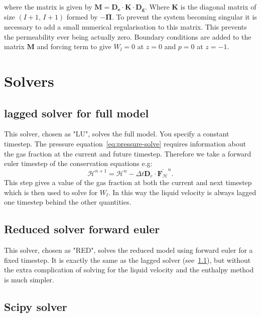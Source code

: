 \documentclass[a4paper,11pt]{article}
\numberwithin{equation}{section}
\begin{document}
where the matrix is given by $\boldsymbol{M} = \boldsymbol{D_e} \cdot \boldsymbol{K} \cdot \boldsymbol{D_g}$.
Where $\boldsymbol{K}$ is the diagonal matrix of size $(I+1, \, I+1)$ formed by $-\overline{\boldsymbol{\Pi}}$.
To prevent the system becoming singular it is necessary to add a small numerical regularisation to this matrix.
This prevents the permeability ever being actually zero.
Boundary conditions are added to the matrix $\boldsymbol{M}$ and forcing term to give
$W_l = 0$ at  $z=0$
and $p=0$ at  $z=-1$.


\section{Solvers}\label{sec:Solvers}

\subsection{lagged solver for full model}\label{sec:lagged-solver-for-full-model}

This solver, chosen as "LU", solves the full model.
You specify a constant timestep.
The pressure equation~\cref{eq:pressure-solve} requires information about the gas fraction at the current and future timestep.
Therefore we take a forward euler timestep of the conservation equations e.g:
\begin{equation}\label{eq:forward-euler}
\boldsymbol{\mathcal{H}}^{n+1} = \boldsymbol{\mathcal{H}}^{n}
- \Delta t \boldsymbol{D}_e \cdot \overline{\boldsymbol{F}_\mathcal{H}}^{n}.
\end{equation}
This step gives a value of the gas fraction at both the current and next timestep which is then used to solve for $W_l$.
In this way the liquid velocity is always lagged one timestep behind the other quantities.

\subsection{Reduced solver forward euler}\label{sec:Reduced-solver-forward-euler}

This solver, chosen as "RED", solves the reduced model using forward euler for a fixed timestep.
It is exactly the same as the lagged solver (see~\cref{sec:lagged-solver-for-full-model}),
but without the extra complication of solving for the liquid velocity and the enthalpy method is much simpler.

\subsection{Scipy solver}\label{sec:Scipy-solver}
\end{document}
